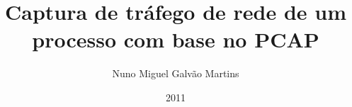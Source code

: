 \documentclass[pt,msc,twoside,12pt]{thesisdifctunl}
\title{Captura de tráfego de rede de um processo com base no PCAP}
\author{Nuno Miguel Galvão Martins}
\date{2011}
\begin{document}
\frontmatter

\frontpage

\presentationpage



\printabstract

\tableofcontents 

\printotherlists 

\printchapters

\printbibliography

\printappendixes 

\end{document}
